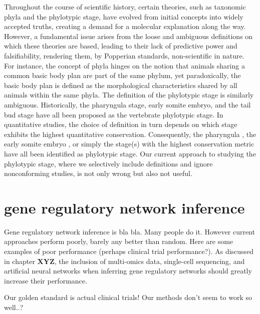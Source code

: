 Throughout the course of scientific history, certain theories, such as taxonomic phyla and the phylotypic stage, have evolved from initial concepts into widely accepted truths, creating a demand for a molecular explanation along the way. However, a fundamental issue arises from the loose and ambiguous definitions on which these theories are based, leading to their lack of predictive power and falsifiability, rendering them, by Popperian standards, non-scientific in nature. For instance, the concept of phyla hinges on the notion that animals sharing a common basic body plan are part of the same phylum, yet paradoxically, the basic body plan is defined as the morphological characteristics shared by all animals within the same phyla\cite{BUDD2000}. The definition of the phylotypic stage is similarly ambiguous. Historically, the pharyngula stage\cite{BALLARD1981}, early somite embryo\cite{Alberch1993}, and the tail bud stage \cite{Slack1993} have all been proposed as the vertebrate phylotypic stage. In quantitative studies, the choice of definition in turn depends on which stage exhibits the highest quantitative conservation. Consequently, the pharyngula \cite{Irie2011,marletaz2018}, the early somite embryo \cite{DomazetLoso2010}, or simply the stage(s) with the highest conservation metric\cite{Kalinka2010,Cordero2020} have all been identified as phylotypic stage. Our current approach to studying the phylotypic stage, where we selectively include definitions and ignore nonconforming studies, is not only wrong but also not useful.

\section{gene regulatory network inference}

Gene regulatory network inference is bla bla. Many people do it. However current approaches perform poorly, barely any better than random. Here are some examples of poor performance (perhaps clinical trial performance?). As discussed in chapter \textbf{XYZ}, the inclusion of multi-omics data, single-cell sequencing, and artificial neural networks when inferring gene regulatory networks should greatly increase their performance. 

Our golden standard is actual clinical trials! Our methods don't seem to work so well..?

